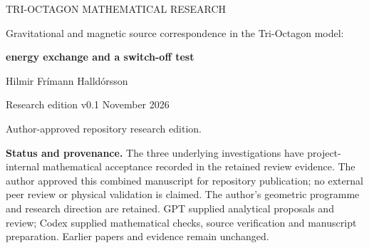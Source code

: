 \documentclass[11pt,a4paper]{article}
\numberwithin{equation}{section}
\theoremstyle{remark}\newtheorem{remark}[theorem]{Remark}
\begin{document}
\begin{titlepage}
{\small\color{blue!45!black} TRI-OCTAGON MATHEMATICAL RESEARCH\par}
\vspace{9mm}
{\LARGE\bfseries\raggedright Gravitational and magnetic source correspondence in the Tri-Octagon model:\par}
\vspace{3mm}
{\LARGE\bfseries energy exchange and a switch-off test\par}
\vspace{8mm}
{\large Hilmir Frímann Halldórsson\par}
\vspace{3mm}
{Research edition v0.1  November 2026\par}
{\small Author-approved repository research edition.\par}
\vspace{7mm}
\begin{abstract}
The native Tri-Octagon state determines an intensity and a geometry-attached axial vector. We derive their sharp inequality and use them in an explicitly added mass--dipole dictionary. Newtonian gravity and magnetostatics are premises of this extension. For disjoint radial source profiles, harmonic averaging gives an exact two-body interaction. Native source updates alone do not balance its change: the same internal update produces different gravitational work at different separations and opposite magnetic work in parallel and transverse placements.

A proposed nonnegative store changes the advance along each frozen native update direction. Its midpoint rule conserves the specified pair-plus-store energy exactly and has a unique solution in stated nonzero load ranges. An initially dipole-silent Fourier preparation yields certified spatial response and neutral-placement predictions. Most directly, after one loaded step with gain \(s_{\rm on}\), a verified switch to zero load predicts the next gain \(2s_{\rm on}-1\), relative to a neutral copy at the same reached state. This test can reject the feedback without identifying a physical carrier. In this preparation, one calibrated channel amplitude determines the first gain; the full registered state is needed for the full vector test. We separate mathematical predictions, parameter identifiability and independent energy measurements. A physical store, instrument, clock and switching procedure remain to be identified.
\end{abstract}
\vfill
{\small\textbf{Status and provenance.} The three underlying investigations have project-internal mathematical acceptance recorded in the retained review evidence. The author approved this combined manuscript for repository publication; no external peer review or physical validation is claimed. The author's geometric programme and research direction are retained. GPT supplied analytical proposals and review; Codex supplied mathematical checks, source verification and manuscript preparation. Earlier papers and evidence remain unchanged.}
\end{titlepage}
\setcounter{page}{2}






\appendix



\end{document}
